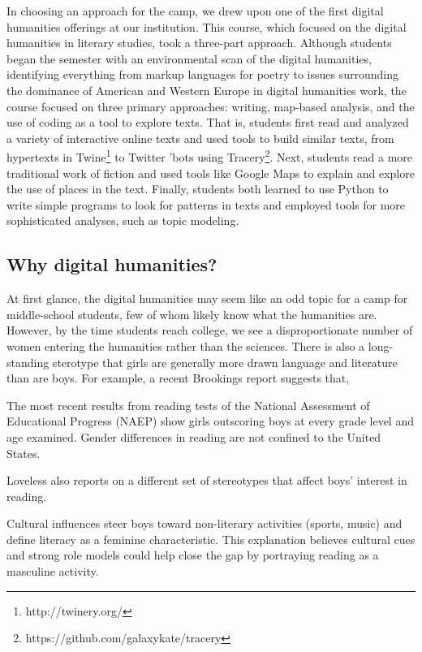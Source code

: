 In choosing an approach for the camp, we drew upon one of the first
digital humanities offerings at our institution.  This course, which
focused on the digital humanities in literary studies, took a
three-part approach.  Although students began the semester with an
environmental scan of the digital humanities, identifying everything
from markup languages for poetry to issues surrounding the dominance
of American and Western Europe in digital humanities work, the
course focused on three primary approaches: writing, map-based
analysis, and the use of coding as a tool to explore texts.  That
is, students first read and analyzed a variety of interactive online
texts and used tools to build similar texts, from hypertexts in
Twine\footnote{http://twinery.org/} to Twitter 'bots using
Tracery\footnote{https://github.com/galaxykate/tracery}.  Next,
students read a more traditional work of fiction and used tools
like Google Maps to explain and explore the use of places in the
text.  Finally, students both learned to use Python to write simple
programs to look for patterns in texts and employed tools for more
sophisticated analyses, such as topic modeling.

\subsection{Why digital humanities?}

At first glance, the digital humanities may seem like an odd topic
for a camp for middle-school students, few of whom likely know what
the humanities are.  However, by the time students reach college,
we see a disproportionate number of women entering the
humanities rather than the sciences.  There is also a long-standing
sterotype that girls are generally more drawn language and literature
than are boys.  For example, a recent Brookings report \cite{Loveless2015}
suggests that,
\begin{blockquote}
The most recent results from reading tests of the National Assessment of Educational Progress (NAEP) show girls outscoring boys at every grade level and age examined. Gender differences in reading are not confined to the United States.
\end{blockquote}

Loveless also reports on a different set of stereotypes that affect
boys' interest in reading.  
\begin{blockquote}
Cultural influences steer boys
toward non-literary activities (sports, music) and define literacy
as a feminine characteristic. This explanation believes cultural
cues and strong role models could help close the gap by portraying
reading as a masculine activity.
\end{blockquote}

